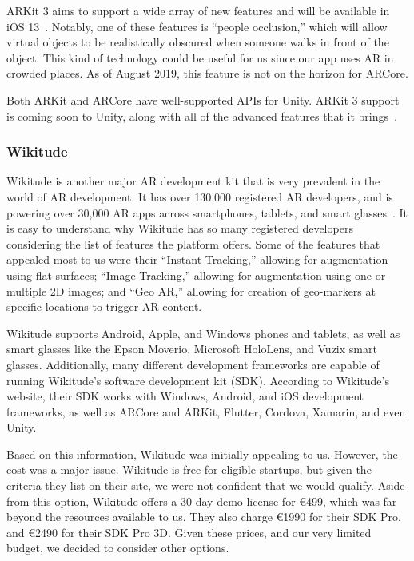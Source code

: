 \documentclass[a4paper, 10pt, american, titlepage]{article}
\begin{document}
ARKit 3 aims to support a wide array of new features and will be available in
iOS 13~\autocite{apple2019}. Notably, one of these features is ``people
occlusion,'' which will allow virtual objects to be realistically obscured when
someone walks in front of the object. This kind of technology could be useful
for us since our app uses AR in crowded places.  As of August 2019, this
feature is not on the horizon for ARCore.

Both ARKit and ARCore have well-supported APIs for Unity. ARKit 3 support is
coming soon to Unity, along with all of the advanced features that it
brings~\autocite{stinson2019}.

\subsubsection{Wikitude}
\label{sec:wikitude}

Wikitude is another major AR development kit that is very prevalent in the
world of AR development. It has over 130,000 registered AR developers, and is
powering over 30,000 AR apps across smartphones, tablets, and smart
glasses~\autocite{wikitude2018}. It is easy to understand why Wikitude has so
many registered developers considering the list of features the platform
offers. Some of the features that appealed most to us were their ``Instant
Tracking,'' allowing for augmentation using flat surfaces; ``Image Tracking,''
allowing for augmentation using one or multiple 2D images; and ``Geo AR,''
allowing for creation of geo-markers at specific locations to trigger AR
content.

Wikitude supports Android, Apple, and Windows phones and tablets, as well as
smart glasses like the Epson Moverio, Microsoft HoloLens, and Vuzix smart
glasses. Additionally, many different development frameworks are capable of
running Wikitude's software development kit (SDK). According to Wikitude's
website, their SDK works with Windows, Android, and iOS development frameworks,
as well as ARCore and ARKit, Flutter, Cordova, Xamarin, and even Unity.

Based on this information, Wikitude was initially appealing to us. However, the
cost was a major issue. Wikitude is free for eligible startups, but given the
criteria they list on their site, we were not confident that we would qualify.
Aside from this option, Wikitude offers a 30-day demo license for \euro{499},
which was far beyond the resources available to us. They also charge
\euro{1990} for their SDK Pro, and \euro{2490} for their SDK Pro 3D. Given
these prices, and our very limited budget, we decided to consider other
options.
\end{document}
